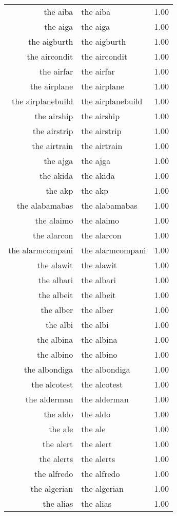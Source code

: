 \begin{table}[ht]
\begin{tabular}{rlr}
  the aiba & the aiba & 1.00 \\ 
  the aiga & the aiga & 1.00 \\ 
  the aigburth & the aigburth & 1.00 \\ 
  the aircondit & the aircondit & 1.00 \\ 
  the airfar & the airfar & 1.00 \\ 
  the airplane & the airplane & 1.00 \\ 
  the airplanebuild & the airplanebuild & 1.00 \\ 
  the airship & the airship & 1.00 \\ 
  the airstrip & the airstrip & 1.00 \\ 
  the airtrain & the airtrain & 1.00 \\ 
  the ajga & the ajga & 1.00 \\ 
  the akida & the akida & 1.00 \\ 
  the akp & the akp & 1.00 \\ 
  the alabamabas & the alabamabas & 1.00 \\ 
  the alaimo & the alaimo & 1.00 \\ 
  the alarcon & the alarcon & 1.00 \\ 
  the alarmcompani & the alarmcompani & 1.00 \\ 
  the alawit & the alawit & 1.00 \\ 
  the albari & the albari & 1.00 \\ 
  the albeit & the albeit & 1.00 \\ 
  the alber & the alber & 1.00 \\ 
  the albi & the albi & 1.00 \\ 
  the albina & the albina & 1.00 \\ 
  the albino & the albino & 1.00 \\ 
  the albondiga & the albondiga & 1.00 \\ 
  the alcotest & the alcotest & 1.00 \\ 
  the alderman & the alderman & 1.00 \\ 
  the aldo & the aldo & 1.00 \\ 
  the ale & the ale & 1.00 \\ 
  the alert & the alert & 1.00 \\ 
  the alerts & the alerts & 1.00 \\ 
  the alfredo & the alfredo & 1.00 \\ 
  the algerian & the algerian & 1.00 \\ 
  the alias & the alias & 1.00 \\ 

\end{tabular}
\end{table}
